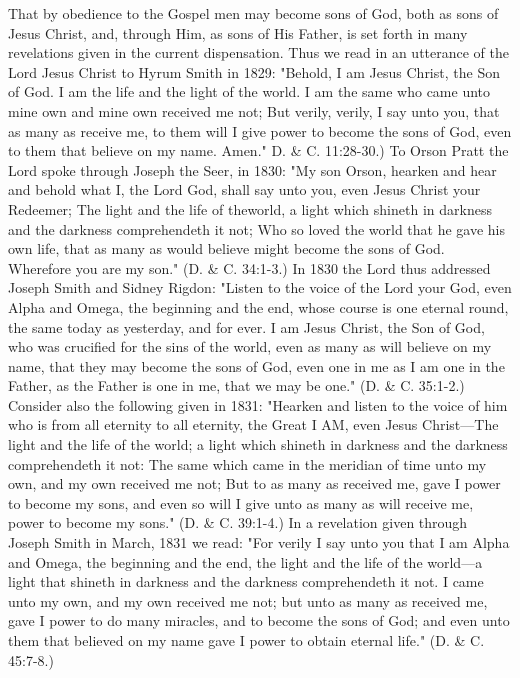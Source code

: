 That by obedience to the Gospel men may become sons of God, both as sons of Jesus Christ,
and, through Him, as sons of His Father, is set forth in many revelations given in the current
dispensation. Thus we read in an utterance of the Lord Jesus Christ to Hyrum Smith in 1829:
"Behold, I am Jesus Christ, the Son of God. I am the life and the light of the world. I am the
same who came unto mine own and mine own received me not; But verily, verily, I say unto
you, that as many as receive me, to them will I give power to become the sons of God, even
to them that believe on my name. Amen." D. \& C. 11:28-30.) To Orson Pratt the Lord spoke
through Joseph the Seer, in 1830: "My son Orson, hearken and hear and behold what I, the
Lord God, shall say unto you, even Jesus Christ your Redeemer; The light and the life of theworld, a light which shineth in darkness and the darkness comprehendeth it not; Who so
loved the world that he gave his own life, that as many as would believe might become the
sons of God. Wherefore you are my son." (D. \& C. 34:1-3.) In 1830 the Lord thus addressed
Joseph Smith and Sidney Rigdon: "Listen to the voice of the Lord your God, even Alpha and
Omega, the beginning and the end, whose course is one eternal round, the same today as
yesterday, and for ever. I am Jesus Christ, the Son of God, who was crucified for the sins of
the world, even as many as will believe on my name, that they may become the sons of God,
even one in me as I am one in the Father, as the Father is one in me, that we may be one." (D.
\& C. 35:1-2.) Consider also the following given in 1831: "Hearken and listen to the voice of
him who is from all eternity to all eternity, the Great I AM, even Jesus Christ—The light and
the life of the world; a light which shineth in darkness and the darkness comprehendeth it
not: The same which came in the meridian of time unto my own, and my own received me
not; But to as many as received me, gave I power to become my sons, and even so will I give
unto as many as will receive me, power to become my sons." (D. \& C. 39:1-4.) In a
revelation given through Joseph Smith in March, 1831 we read: "For verily I say unto you
that I am Alpha and Omega, the beginning and the end, the light and the life of the world—a
light that shineth in darkness and the darkness comprehendeth it not. I came unto my own,
and my own received me not; but unto as many as received me, gave I power to do many
miracles, and to become the sons of God; and even unto them that believed on my name gave
I power to obtain eternal life." (D. \& C. 45:7-8.)

